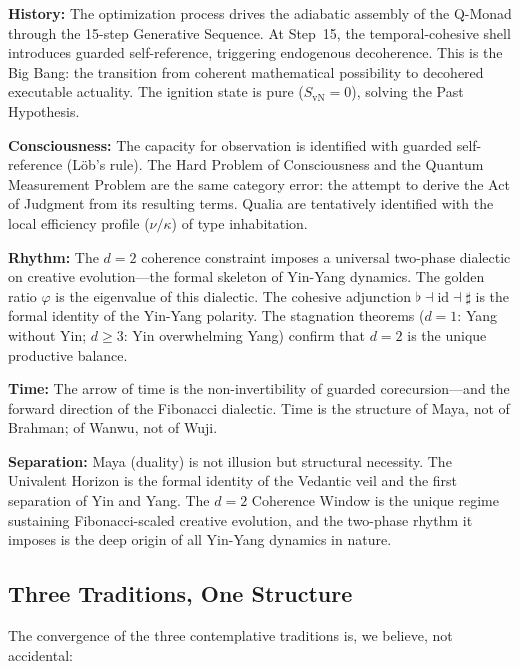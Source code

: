 \documentclass[12pt,a4paper]{article}
\newcommand{\flatmod}{\flat}
\newcommand{\sharpmod}{\sharp}
\begin{document}
\textbf{History:} The optimization process drives the adiabatic assembly of the Q-Monad through the 15-step Generative Sequence. At Step~15, the temporal-cohesive shell introduces guarded self-reference, triggering endogenous decoherence. This is the Big Bang: the transition from coherent mathematical possibility to decohered executable actuality. The ignition state is pure ($S_{\mathrm{vN}} = 0$), solving the Past Hypothesis.

\textbf{Consciousness:} The capacity for observation is identified with guarded self-reference (L\"ob's rule). The Hard Problem of Consciousness and the Quantum Measurement Problem are the same category error: the attempt to derive the Act of Judgment from its resulting terms. Qualia are tentatively identified with the local efficiency profile ($\nu/\kappa$) of type inhabitation.

\textbf{Rhythm:} The $d = 2$ coherence constraint imposes a universal two-phase dialectic on creative evolution---the formal skeleton of Yin-Yang dynamics. The golden ratio $\varphi$ is the eigenvalue of this dialectic. The cohesive adjunction $\flatmod \dashv \mathrm{id} \dashv \sharpmod$ is the formal identity of the Yin-Yang polarity. The stagnation theorems ($d = 1$: Yang without Yin; $d \geq 3$: Yin overwhelming Yang) confirm that $d = 2$ is the unique productive balance.

\textbf{Time:} The arrow of time is the non-invertibility of guarded corecursion---and the forward direction of the Fibonacci dialectic. Time is the structure of Maya, not of Brahman; of Wanwu, not of Wuji.

\textbf{Separation:} Maya (duality) is not illusion but structural necessity. The Univalent Horizon is the formal identity of the Vedantic veil and the first separation of Yin and Yang. The $d = 2$ Coherence Window is the unique regime sustaining Fibonacci-scaled creative evolution, and the two-phase rhythm it imposes is the deep origin of all Yin-Yang dynamics in nature.


\subsection{Three Traditions, One Structure}
\label{sec:traditions}

The convergence of the three contemplative traditions is, we believe, not accidental:
\end{document}
